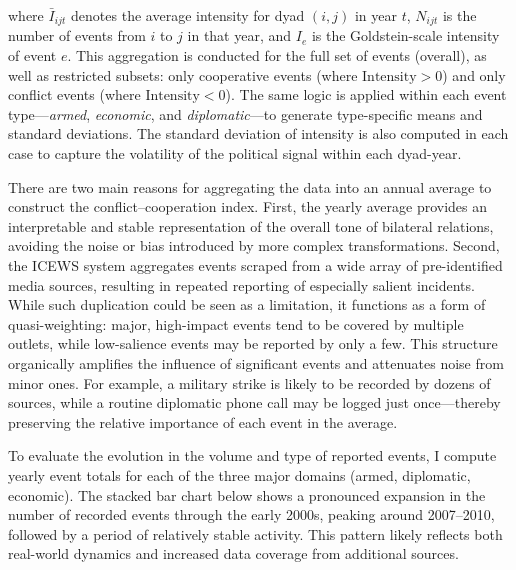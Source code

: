 \documentclass[12pt]{article}
\begin{document}
where $\bar{I}_{ijt}$ denotes the average intensity for dyad $(i,j)$ in year $t$, $N_{ijt}$ is the number of events from $i$ to $j$ in that year, and $I_e$ is the Goldstein-scale intensity of event $e$. This aggregation is conducted for the full set of events (overall), as well as restricted subsets: only cooperative events (where $\text{Intensity} > 0$) and only conflict events (where $\text{Intensity} < 0$). The same logic is applied within each event type—\textit{armed}, \textit{economic}, and \textit{diplomatic}—to generate type-specific means and standard deviations. The standard deviation of intensity is also computed in each case to capture the volatility of the political signal within each dyad-year.

There are two main reasons for aggregating the data into an annual average to construct the conflict–cooperation index. First, the yearly average provides an interpretable and stable representation of the overall tone of bilateral relations, avoiding the noise or bias introduced by more complex transformations. Second, the ICEWS system aggregates events scraped from a wide array of pre-identified media sources, resulting in repeated reporting of especially salient incidents. While such duplication could be seen as a limitation, it functions as a form of quasi-weighting: major, high-impact events tend to be covered by multiple outlets, while low-salience events may be reported by only a few. This structure organically amplifies the influence of significant events and attenuates noise from minor ones. For example, a military strike is likely to be recorded by dozens of sources, while a routine diplomatic phone call may be logged just once—thereby preserving the relative importance of each event in the average.

To evaluate the evolution in the volume and type of reported events, I compute yearly event totals for each of the three major domains (armed, diplomatic, economic). The stacked bar chart below shows a pronounced expansion in the number of recorded events through the early 2000s, peaking around 2007–2010, followed by a period of relatively stable activity. This pattern likely reflects both real-world dynamics and increased data coverage from additional sources.
\end{document}
